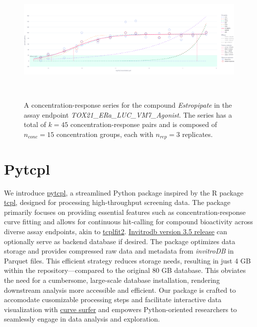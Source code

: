\begin{figure}[htbp]  %
    \centering
    \includegraphics[width=1.0\textwidth]{figures/concentration_response_series_2.png}  
    \caption{A concentration-response series for the compound \textit{Estropipate} in the assay endpoint \textit{TOX21\_ERa\_LUC\_VM7\_Agonist}. The series has a total of $k = 45$ concentration-response pairs and is composed of $n_{conc} = 15$ concentration groups, each with $n_{rep} = 3$ replicates.}
~\label{fig:concentration_response_series} 
\end{figure}



\section{Pytcpl}
We introduce \href{https://github.com/rbBosshard/pytcpl}{pytcpl}, a streamlined Python package inspired by the R package \href{https://github.com/USEPA/CompTox-ToxCast-tcpl}{tcpl}, designed for processing high-throughput screening data. The package primarily focuses on providing essential features such as concentration-response curve fitting and allows for continuous hit-calling for compound bioactivity across diverse assay endpoints, akin to \href{https://github.com/USEPA/CompTox-ToxCast-tcplFit2}{tcplfit2}. \href{https://cfpub.epa.gov/si/si_public_record_Report.cfm?dirEntryId=355484&Lab=CCTE}{Invitrodb version 3.5 release} can optionally serve as backend database if desired. The package optimizes data storage and provides compressed raw data and metadata from \emph{invitroDB} in Parquet files. This efficient strategy reduces storage needs, resulting in just 4 GB within the repository—compared to the original 80 GB database. This obviates the need for a cumbersome, large-scale database installation, rendering downstream analysis more accessible and efficient. Our package is crafted to accomodate cusomizable processing steps and facilitate interactive data visualization with \href{https://pytcpl.streamlit.app/}{curve surfer} and empowers Python-oriented researchers to seamlessly engage in data analysis and exploration.

